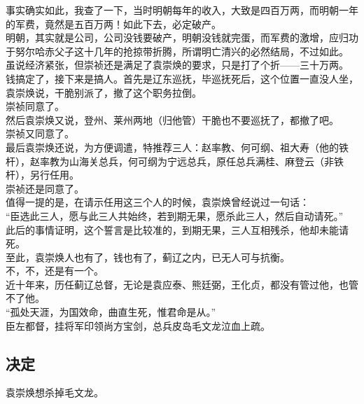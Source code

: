 \begin{multicols}{\theparacolNo}
事实确实如此，我查了一下，当时明朝每年的收入，大致是四百万两，而明朝一年的军费，竟然是五百万两！如此下去，必定破产。\\

明朝，其实就是公司，公司没钱要破产，明朝没钱就完蛋，而军费的激增，应归功于努尔哈赤父子这十几年的抢掠带折腾，所谓明亡清兴的必然结局，不过如此。\\

虽说经济紧张，但崇祯还是满足了袁崇焕的要求，只是打了个折——三十万两。\\

钱搞定了，接下来是搞人。首先是辽东巡抚，毕巡抚死后，这个位置一直没人坐，袁崇焕说，干脆别派了，撤了这个职务拉倒。\\

崇祯同意了。\\

然后袁崇焕又说，登州、莱州两地（归他管）干脆也不要巡抚了，都撤了吧。\\

崇祯又同意了。\\

最后袁崇焕还说，为方便调遣，特推荐三人：赵率教、何可纲、祖大寿（他的铁杆），赵率教为山海关总兵，何可纲为宁远总兵，原任总兵满桂、麻登云（非铁杆），另行任用。\\

崇祯还是同意了。\\

值得一提的是，在请示任用这三个人的时候，袁崇焕曾经说过一句话：\\

“臣选此三人，愿与此三人共始终，若到期无果，愿杀此三人，然后自动请死。”\\

此后的事情证明，这个誓言是比较准的，到期无果，三人互相残杀，他却未能请死。\\

至此，袁崇焕人也有了，钱也有了，蓟辽之内，已无人可与抗衡。\\

不，不，还是有一个。\\

近十年来，历任蓟辽总督，无论是袁应泰、熊廷弼，王化贞，都没有管过他，也管不了他。\\

“孤处天涯，为国效命，曲直生死，惟君命是从。”\\

臣左都督，挂将军印领尚方宝剑，总兵皮岛毛文龙泣血上疏。\\

\subsection{决定}
袁崇焕想杀掉毛文龙。\\


\end{multicols}
